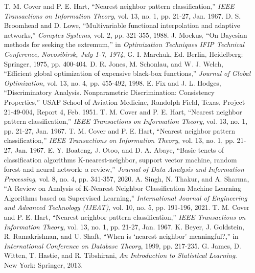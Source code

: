 \documentclass[conference]{IEEEtran}
\begin{document}
\begin{thebibliography}{99}
 T. M. Cover and P. E. Hart, “Nearest neighbor pattern classification,” \textit{IEEE Transactions on Information Theory}, vol. 13, no. 1, pp. 21-27, Jan. 1967.
 D. S. Broomhead and D. Lowe, “Multivariable functional interpolation and adaptive networks,” \textit{Complex Systems}, vol. 2, pp. 321-355, 1988.
 J. Mockus, “On Bayesian methods for seeking the extremum,” in \textit{Optimization Techniques IFIP Technical Conference, Novosibirsk, July 1-7, 1974}, G. I. Marchuk, Ed. Berlin, Heidelberg: Springer, 1975, pp. 400-404.
 D. R. Jones, M. Schonlau, and W. J. Welch, “Efficient global optimization of expensive black-box functions,” \textit{Journal of Global Optimization}, vol. 13, no. 4, pp. 455-492, 1998.
 E. Fix and J. L. Hodges, “Discriminatory Analysis. Nonparametric Discrimination: Consistency Properties,” USAF School of Aviation Medicine, Randolph Field, Texas, Project 21-49-004, Report 4, Feb. 1951.
 T. M. Cover and P. E. Hart, “Nearest neighbor pattern classification,” \textit{IEEE Transactions on Information Theory}, vol. 13, no. 1, pp. 21-27, Jan. 1967.
 T. M. Cover and P. E. Hart, “Nearest neighbor pattern classification,” \textit{IEEE Transactions on Information Theory}, vol. 13, no. 1, pp. 21-27, Jan. 1967.
 E. Y. Boateng, J. Otoo, and D. A. Abaye, “Basic tenets of classification algorithms K-nearest-neighbor, support vector machine, random forest and neural network: a review,” \textit{Journal of Data Analysis and Information Processing}, vol. 8, no. 4, pp. 341-357, 2020.
 A. Singh, N. Thakur, and A. Sharma, “A Review on Analysis of K-Nearest Neighbor Classification Machine Learning Algorithms based on Supervised Learning,” \textit{International Journal of Engineering and Advanced Technology (IJEAT)}, vol. 10, no. 5, pp. 191-196, 2021.
 T. M. Cover and P. E. Hart, “Nearest neighbor pattern classification,” \textit{IEEE Transactions on Information Theory}, vol. 13, no. 1, pp. 21-27, Jan. 1967.
 K. Beyer, J. Goldstein, R. Ramakrishnan, and U. Shaft, “When is ‘nearest neighbor’ meaningful?,” in \textit{International Conference on Database Theory}, 1999, pp. 217-235.
 G. James, D. Witten, T. Hastie, and R. Tibshirani, \textit{An Introduction to Statistical Learning}. New York: Springer, 2013.

\end{thebibliography}
\end{document}
